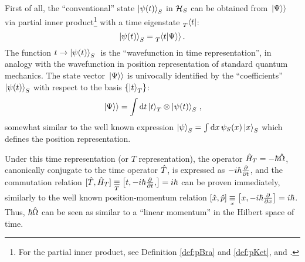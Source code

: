 First of all, the ``conventional'' state $\ket{\psi(t)}_S$ in $\mathcal{H}_S$
can be obtained from $\left.\left| \Psi \right\rangle\right\rangle$ via partial inner product\footnote{
  For the partial inner product,
  see Definition \ref{def:pBra} and \ref{def:pKet},
  and \cite[.3]{QMT_Jacobs}.
}
with a time eigenstate $\prescript{}{T}{\bra{t}}$:
\begin{equation}\label{eq:pw:standard_evolution}
  \ket{\psi(t)}_S = \prescript{}{T}{\!\left.\left\langle t \middle| \Psi \right\rangle\right\rangle} \, \text{.}
\end{equation}
The function $ t \rightarrow \ket{\psi(t)}_S \; $ is the
``wavefunction in time representation'', in analogy
with the wavefunction in position representation of standard quantum mechanics.
The state vector $\left.\left| \Psi \right\rangle\right\rangle$ is univocally identified by the ``coefficients'' $\ket{\psi(t)}_S$
with respect to the basis $\left\{\ket{t}_T\right\}$:
\begin{equation}\label{eq:pw:}
  \left.\left| \Psi \right\rangle\right\rangle = \int \dd{t} \ket{t}_T \otimes \ket{\psi(t)}_S \, \text{,}
\end{equation}
somewhat similar to the well known expression $\ket{\psi}_S = \int \dd{x} \psi_{S}(x) \ket{x}_S$
which defines the position representation.

Under this time representation%
(or $T$ representation), the operator $\hat{H}_T = -\hbar\hat{\Omega}$,
canonically conjugate to the time operator $\hat{T}$, is expressed as $-i\hbar\pdv{t}$,
and the commutation relation
$[\op{T}, \op{H}_T] \repr[T] \comm{t, -i\hbar\pdv{t}}{} = i\hbar$
can be proven
immediately, similarly to the well known position-momentum relation
$\comm{\op{x}}{\op{p}} \repr[x] \comm{x}{-i\hbar\pdv{x}} = i\hbar$.
Thus, $\hbar\hat{\Omega}$ can be seen as similar to a ``linear momentum''
in the Hilbert space of time.


